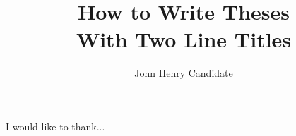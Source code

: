 \documentclass[12pt,PhD,wordcount,twoside]{muthesis}
\begin{document}

\title{How to Write Theses\\
  With Two Line Titles}
\author{John Henry Candidate}

\beforeabstract



\afterabstract

I would like to thank...
\afterpreface










\appendix

\end{document}
